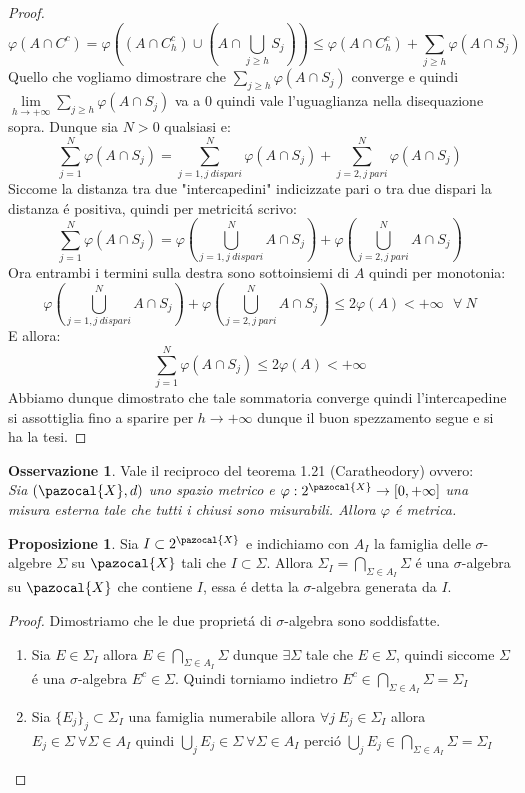\documentclass[11pt,a4paper]{report}
\theoremstyle{plain}
\theoremstyle{definition}
\newtheorem{prop}[thm]{Proposizione} %
\newtheorem{oss}[thm]{Osservazione} %
\newcommand{\X}{\pazocal{X}}
\begin{document}
\begin{proof}
\[
	\varphi(A \cap C^c) = \varphi((A \cap C_h^c) \cup (A \cap \bigcup\limits_{j \ge h}S_j))
	\le \varphi(A \cap C_h^c) + \sum\limits_{j \ge h}\varphi(A \cap S_j)
\]
Quello che vogliamo dimostrare che $\sum\limits_{j \ge h}\varphi(A \cap S_j)$ converge e quindi $\lim\limits_{h \rightarrow +\infty}\sum\limits_{j \ge h}\varphi(A \cap S_j)$ va a $0$ quindi vale l'uguaglianza nella disequazione sopra. Dunque sia $N > 0$ qualsiasi e:
\[
	\sum\limits_{j=1}^{N}\varphi(A \cap S_j) = \sum\limits_{j=1, j\ dispari}^{N}\varphi(A \cap S_j) + \sum\limits_{j=2, j\ pari}^{N}\varphi(A \cap S_j)
\]
Siccome la distanza tra due "intercapedini" indicizzate pari o tra due dispari la distanza \'e positiva, quindi per metricit\'a scrivo:
\[
	\sum\limits_{j=1}^{N}\varphi(A \cap S_j) = \varphi(\bigcup\limits_{j=1,j\ dispari}^N A \cap S_j) + \varphi(\bigcup\limits_{j=2, j\ pari}^N A \cap S_j)
\]
Ora entrambi i termini sulla destra sono sottoinsiemi di $A$ quindi per monotonia:
\[
	\varphi(\bigcup\limits_{j=1,j\ dispari}^N A \cap S_j) + \varphi(\bigcup\limits_{j=2, j\ pari}^N A \cap S_j) \le 2\varphi(A) < +\infty\ \ \ \forall\ N
\]
E allora:
\[
	\sum\limits_{j=1}^{N}\varphi(A \cap S_j) \le 2\varphi(A) < +\infty
\]
Abbiamo dunque dimostrato che tale sommatoria converge quindi l'intercapedine si assottiglia fino a sparire per $h \rightarrow +\infty$ dunque il buon spezzamento segue e si ha la tesi.
\end{proof}

\begin{oss}
	Vale il reciproco del teorema 1.21 (Caratheodory) ovvero:\\
	\textit{Sia $(\X,d)$ uno spazio metrico e $\varphi : 2^\X \rightarrow [0,+\infty]$ una misura esterna tale che tutti i chiusi sono misurabili. Allora $\varphi$ \'e metrica.}
\end{oss}

\begin{prop}
	Sia $I \subset 2^\X$ e indichiamo con $A_I$ la famiglia delle $\sigma$-algebre $\Sigma$ su $\X$ tali che $I \subset \Sigma$. Allora $\Sigma_I = \bigcap\limits_{\Sigma \in A_I}\Sigma$ \'e una $\sigma$-algebra su $\X$ che contiene $I$, essa \'e detta la $\sigma$-algebra generata da $I$.
\begin{proof}
	Dimostriamo che le due propriet\'a di $\sigma$-algebra sono soddisfatte.
	\begin{enumerate}
		\item Sia $E \in \Sigma_I$ allora $E \in \bigcap\limits_{\Sigma \in A_I}\Sigma$ dunque $\exists \Sigma$ tale che $E \in \Sigma$, quindi siccome $\Sigma$ \'e una $\sigma$-algebra $E^c \in \Sigma$. Quindi torniamo indietro $E^c \in \bigcap\limits_{\Sigma \in A_I}\Sigma = \Sigma_I$
		\item Sia $\{E_j\}_j \subset \Sigma_I$ una famiglia numerabile allora $\forall j\  E_j \in \Sigma_I$ allora $E_j \in \Sigma\ \forall \Sigma \in A_I$ quindi $\bigcup\limits_j E_j \in \Sigma\ \forall \Sigma \in A_I$ perci\'o $\bigcup\limits_j E_j \in \bigcap\limits_{\Sigma \in A_I}\Sigma = \Sigma_I$
	\end{enumerate}	 
\end{proof}
\end{prop}
\end{document}
